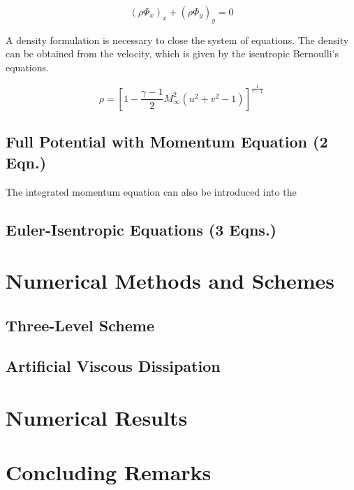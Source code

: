 \documentclass[hidelinks, 12pt]{article}
\begin{document}
\begin{equation}
\left(\rho \Phi_x\right)_x + \left(\rho \Phi_y\right)_y = 0
\end{equation}

A density formulation is necessary to close the system of equations. The density can be obtained from the velocity, which is given by the isentropic Bernoulli's equations. 

\begin{equation}
\rho = \left[1 - \dfrac{\gamma - 1}{2}M_{\infty}^2\left(u^2 + v^2 - 1\right)\right]^{\frac{1}{\gamma - 1}}
\end{equation}

\subsection{Full Potential with Momentum Equation (2 Eqn.)}
The integrated momentum equation can also be introduced into the 

\subsection{Euler-Isentropic Equations (3 Eqns.)}

\section{Numerical Methods and Schemes}\label{schemes}

\subsection{Three-Level Scheme}

\subsection{Artificial Viscous Dissipation}

\section{Numerical Results}


\section{Concluding Remarks}


	
\end{document}
